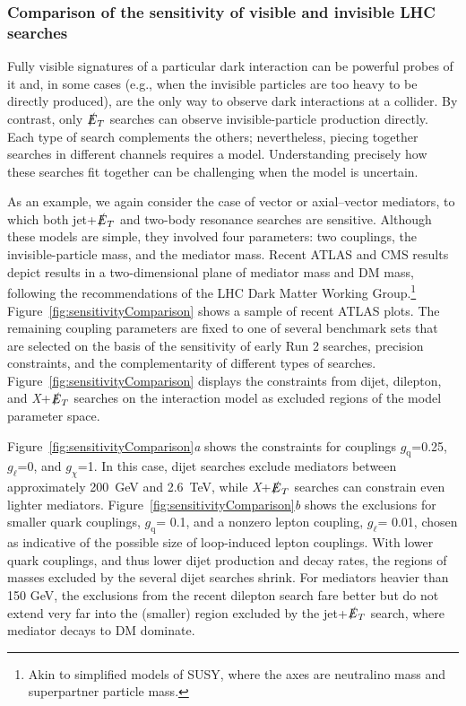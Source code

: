 \documentclass{ar-1col}
\newcommand{\chiDM}{\ensuremath{\chi}\xspace}
\newcommand{\IP}{invisible particle}
\newcommand{\gDM}{\ensuremath{g_{\chiDM}}\xspace}
\newcommand{\gdm}{\gDM}
\newcommand{\gl}{$g_{\ell}$\xspace}
\newcommand{\gq}{$g_{\mathrm{q}}$\xspace}
\newcommand{\MET}{\ensuremath{\slashed{E}_T}\xspace}
\begin{document}
\subsubsection{Comparison of the sensitivity of visible and invisible LHC searches}\label{sub:comparisonVisibleInvisible}

Fully visible signatures of a particular dark interaction can be
powerful probes of it and, in some cases (e.g., when the {\IP}s
are too heavy to be directly produced), are the only way to observe
dark interactions at a collider. By contrast, only \MET
searches can observe invisible-particle production directly.
Each type of search complements the others; nevertheless, piecing
together searches in different channels requires a model.
Understanding precisely how these searches fit together can be
challenging when the model is uncertain.

As an example, we again consider the case of vector or
axial--vector mediators, to which both jet+\MET and two-body
resonance searches are sensitive. Although these models are simple,
they involved four parameters: two couplings, the invisible-particle
mass, and the mediator mass. Recent ATLAS and CMS results depict
results in a two-dimensional plane of mediator mass and DM
mass, following the recommendations of the LHC Dark Matter Working
Group.\footnote{Akin to simplified models of SUSY, where the axes
are neutralino mass and superpartner particle mass.}
Figure~\ref{fig:sensitivityComparison} shows a sample of
recent ATLAS plots. The remaining coupling parameters are
fixed to one of several benchmark sets that are selected on the basis of the
sensitivity of early Run 2 searches, precision constraints, and
the complementarity of different types of searches. Figure~\ref{fig:sensitivityComparison} displays the
constraints from dijet, dilepton, and \textit{X}+\MET searches on the
interaction model as excluded regions of the model
parameter space.

Figure~\ref{fig:sensitivityComparison}\textit{a} shows the constraints for couplings
\gq=0.25, \gl=0, and \gdm=1. In this case, dijet searches exclude
mediators between approximately 200~GeV and 2.6~TeV, while \textit{X}+\MET searches
can constrain even lighter mediators. Figure~\ref{fig:sensitivityComparison}\textit{b} shows the
exclusions for smaller quark couplings, \gq = 0.1, and a nonzero
lepton coupling, \gl = 0.01, chosen as indicative of the possible
size of loop-induced lepton couplings. With lower quark couplings,
and thus lower dijet production and decay rates, the regions of
masses excluded by the several dijet searches shrink. For
mediators heavier than 150 GeV, the exclusions from the recent
dilepton search fare better but do not extend very far into the
(smaller) region excluded by the jet+\MET search, where mediator
decays to DM dominate.
\end{document}
